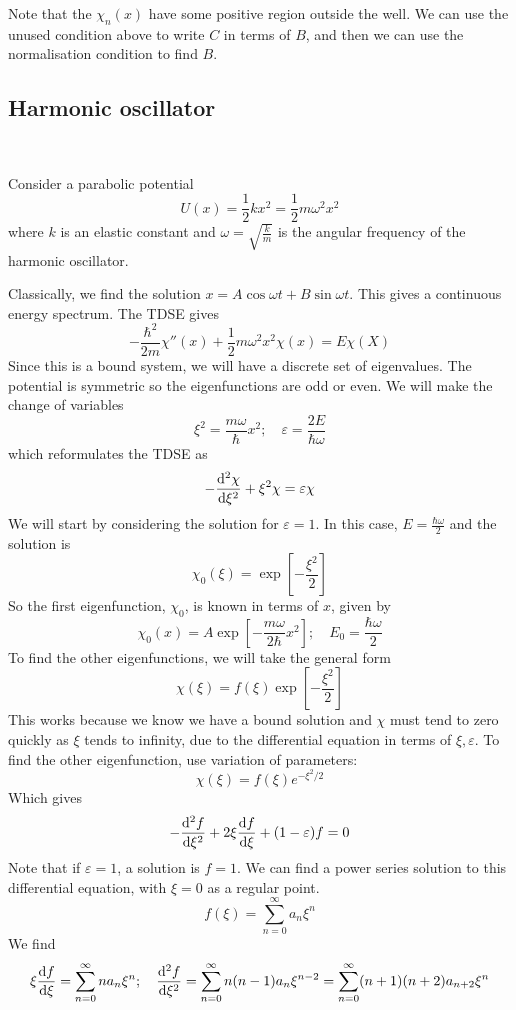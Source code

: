 \documentclass[a4paper,11pt]{article}
\begin{document}
Note that the \( \chi_n(x) \) have some positive region outside the well.
We can use the unused condition above to write \( C \) in terms of \( B \), and then we can use the normalisation condition to find \( B \).

\subsection{Harmonic oscillator}\ \vspace*{-1.5em}
\begin{example}
    Consider a parabolic potential
\[
	U(x) = \frac{1}{2} kx^2 = \frac{1}{2} m \omega^2 x^2
\]
where \( k \) is an elastic constant and \( \omega = \sqrt{\frac{k}{m}} \) is the angular frequency of the harmonic oscillator.
\end{example}
Classically, we find the solution \( x = A \cos \omega t + B \sin \omega t \).
This gives a continuous energy spectrum.
The TDSE gives
\[
	-\frac{\hbar^2}{2m} \chi''(x) + \frac{1}{2} m\omega^2 x^2 \chi(x) = E \chi(X)
\]
Since this is a bound system, we will have a discrete set of eigenvalues.
The potential is symmetric so the eigenfunctions are odd or even.
We will make the change of variables
\[
	\xi^2 = \frac{m\omega}{\hbar} x^2;\quad \varepsilon = \frac{2E}{\hbar \omega}
\]
which reformulates the TDSE as
\[
	-\dv[2]{\chi}{\xi} + \xi^2 \chi = \varepsilon \chi
\]
We will start by considering the solution for \( \varepsilon = 1 \).
In this case, \( E = \frac{\hbar \omega}{2} \) and the solution is
\[
	\chi_0(\xi) = \exp[-\frac{\xi^2}{2}]
\]
So the first eigenfunction, \( \chi_0 \), is known in terms of \( x \), given by
\[
	\chi_0(x) = A \exp[-\frac{m\omega}{2\hbar}x^2];\quad E_0 = \frac{\hbar \omega}{2}
\]
To find the other eigenfunctions, we will take the general form
\[
	\chi(\xi) = f(\xi) \exp[-\frac{\xi^2}{2}]
\]
This works because we know we have a bound solution and \( \chi \) must tend to zero quickly as \( \xi \) tends to infinity, due to the differential equation in terms of \( \xi, \varepsilon \).
To find the other eigenfunction, use variation of parameters: 
\[
    \chi(\xi) = f(\xi) e^{-\xi^2/2}
\]
Which gives
\[
	-\dv[2]{f}{\xi} + 2\xi \dv{f}{\xi} + (1-\varepsilon)f = 0
\]
Note that if \( \varepsilon = 1 \), a solution is \( f = 1 \).
We can find a power series solution to this differential equation, with \( \xi = 0 \) as a regular point.
\[
	f(\xi) = \sum_{n=0}^\infty a_n \xi^n
\]
We find
\[
	\xi \dv{f}{\xi} = \sum_{n=0}^\infty n a_n \xi^n;\quad \dv[2]{f}{\xi} = \sum_{n=0}^\infty n(n-1)a_n \xi^{n-2} = \sum_{n=0}^\infty (n+1)(n+2)a_{n+2}\xi^n
\]
\end{document}
